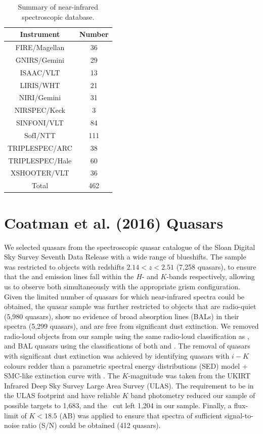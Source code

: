 \begin{table}
  \small
  \centering
  \caption{Summary of near-infrared spectroscopic database.}
  \label{tab:specnums}
    \begin{tabular}{cc} 
    \hline
    Instrument & Number \\  
    \hline
    FIRE/Magellan   & 36 \\
    GNIRS/Gemini    & 29 \\
    ISAAC/VLT       & 13  \\
    LIRIS/WHT       & 21  \\
    NIRI/Gemini     & 31 \\
    NIRSPEC/Keck    & 3   \\ 
    SINFONI/VLT     & 84 \\
    SofI/NTT        & 111 \\
    TRIPLESPEC/ARC  & 38 \\
    TRIPLESPEC/Hale & 60 \\
    XSHOOTER/VLT    & 36  \\
    \hline
    Total & 462 \\
    \hline
    \end{tabular}
\end{table}




\section{Coatman et al. (2016) Quasars}

We selected quasars from the spectroscopic quasar catalogue of the Sloan Digital Sky Survey \citep[SDSS;][]{york00} Seventh Data Release \citep[DR7;][]{schneider10} with a wide range of  blueshifts. 
The sample was restricted to objects with redshifts $2.14 < z <2.51$ (7,258 quasars), to ensure that the \hb and \ha emission lines fall within the $H$- and $K$-bands respectively, allowing us to observe both simultaneously with the appropriate grism configuration.
Given the limited number of quasars for which near-infrared spectra could be obtained, the quasar sample was further restricted to objects that are radio-quiet (5,980 quasars), show no evidence of broad absorption lines (BALs) in their spectra (5,299 quasars), and are free from significant dust extinction. 
We removed radio-loud objects from our sample using the same radio-loud classification as \citet{shen11}, and BAL quasars using the classifications of both \citet{shen11} and \citet{allen11}. 
The removal of quasars with significant dust extinction was achieved by identifying quasars with $i-K$ colours redder than a parametric spectral energy distributions (SED) model + SMC-like extinction curve with  \citep[see][]{maddox12}.
The $K$-magnitude was taken from the UKIRT Infrared Deep Sky Survey \citep[UKIDSS;][]{lawrence07} Large Area Survey (ULAS). 
The requirement to be in the ULAS footprint and have reliable $K$ band photometry reduced our sample of possible targets to 1,683, and the \ebv\, cut left 1,204 in our sample. 
Finally, a flux-limit of $K<18.5$ (AB) was applied to ensure that spectra of sufficient signal-to-noise ratio (S/N) could be obtained (412 quasars). 
 
